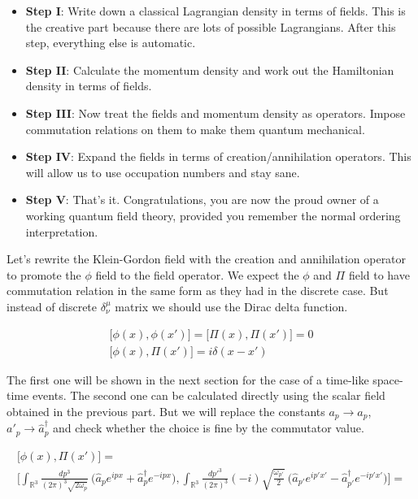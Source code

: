\begin{itemize}
    \item \textbf{Step I}: Write down a classical Lagrangian density in terms of fields. This is the creative part because there are lots of 
        possible Lagrangians. After this step, everything else is automatic.
    \item \textbf{Step II}: Calculate the momentum density and work out the Hamiltonian density in terms of fields.
    \item \textbf{Step III}: Now treat the fields and momentum density as operators. Impose commutation relations on them to make them 
        quantum mechanical.
    \item \textbf{Step IV}: Expand the fields in terms of creation/annihilation operators. This will allow us to use occupation numbers 
        and stay sane.
    \item \textbf{Step V}: That's it. Congratulations, you are now the proud owner of a working quantum field theory, provided you remember 
        the normal ordering interpretation.
\end{itemize}

Let's rewrite the Klein-Gordon field with the creation and annihilation operator to promote the $\phi$ field to the field operator. We expect
the $\phi$ and $\Pi$ field to have commutation relation in the same form as they had in the discrete case. But instead of discrete $\delta^{\mu}_{\nu}$ matrix
we should use the Dirac delta function.

\begin{equation*}
    \begin{gathered}
        \big[\phi(x), \phi(x')] = \big[\Pi(x), \Pi(x')] = 0 \\
        \big[\phi(x), \Pi(x')] = i \delta(x - x')
    \end{gathered}
\end{equation*}

The first one will be shown in the next section for the case of a time-like space-time events. The second one can be calculated
directly using the scalar field obtained in the previous part. But we will replace the constants $a_{p} \to \hat{a}_{p}$, 
$a'_{p} \to \hat{a}^{\dagger}_{p}$ and check whether the choice is fine by the commutator value.

\begin{equation*}
    \begin{gathered}
        \big[\phi(x), \Pi(x')] = \\
        \bigg[
            \int_{\mathbb{R}^{3}} \frac{dp^{3}}{(2 \pi)^{3} \sqrt{2 \omega_{p}}} \ \big(\hat{a}_{p} e^{i p x} + \hat{a}^{\dagger}_{p} e^{- i p x}\big),
            \int_{\mathbb{R}^{3}} \frac{dp'^{3}}{(2 \pi)^{3}} (-i) \sqrt{\frac{\omega_{p'}}{2}} \ \big(\hat{a}_{p'} e^{i p' x'} - \hat{a}^{\dagger}_{p'} e^{- i p' x'}\big)
        \bigg] = \\
    \end{gathered}
\end{equation*}

